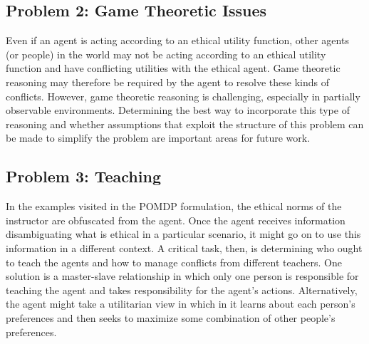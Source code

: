 \documentclass[11pt]{article}
\begin{document}
\subsection{Problem 2: Game Theoretic Issues} Even if an agent is acting according to an ethical utility function, other agents (or people) in the world may not be acting according to an ethical utility function and have conflicting utilities with the ethical agent. Game theoretic reasoning may therefore be required by the agent to resolve these kinds of conflicts. However, game theoretic reasoning is challenging, especially in partially observable environments. Determining the best way to incorporate this type of reasoning and whether assumptions that exploit the structure of this problem can be made to simplify the problem are important areas for future work.


\subsection{Problem 3: Teaching} In the examples visited in the POMDP formulation, the ethical norms of the instructor are obfuscated from the agent. Once the agent receives information disambiguating what is ethical in a particular scenario, it might go on to use this information in a different context. %
A critical task, then, is determining who ought to teach the agents and how to manage conflicts from different teachers. One solution is a master-slave relationship in which only one person is responsible for teaching the agent and takes responsibility for the agent's actions. Alternatively, the agent might take a utilitarian view in which in it learns about each person's preferences and then seeks to maximize some combination of other people's preferences.
\end{document}
